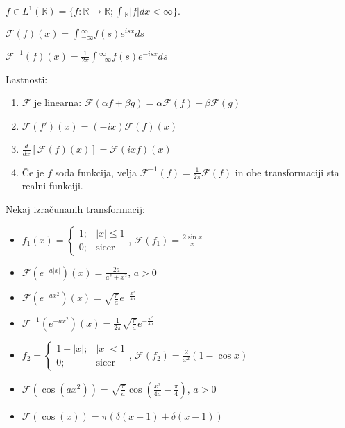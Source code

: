 \documentclass[11pt,a4paper]{amsart}
\theoremstyle{definition} %
\theoremstyle{plain} %
\let\oldint\int
\renewcommand{\int}{\oldint \!}
\newcommand{\R}{\mathbb R}
\newcommand{\F}{\mathcal{F}}
\begin{document}
$f \in L^1(\R ) = \{ f: \R \longrightarrow \R ; \int_\R |f| dx < \infty \}$.

$\F (f) (x) = \int_{-\infty}^\infty f(s) e^{isx} ds$

$\F^{-1} (f) (x) = \frac{1}{2\pi} \int_{-\infty}^\infty f(s) e^{-isx} ds$

Lastnosti:
\begin{enumerate}

\item $\F$ je linearna: $\F(\alpha f + \beta g) = \alpha \F(f) + \beta \F (g)$

\item $\F (f')(x) = (-ix) \F(f)(x)$

\item $\frac{d}{dx} \left[ \F (f)(x) \right] = \F(ixf) (x)$

\item Če je $f$ soda funkcija, velja $\F^{-1}(f) = \frac{1}{2\pi}\F(f)$ in obe transformaciji sta realni funkciji.

\end{enumerate}

Nekaj izračunanih transformacij:
\begin{itemize}

\item $f_1(x) = \begin{cases} 1;& |x| \leq 1 \\ 0; &\text{sicer} \end{cases}$, $\F(f_1) = \frac{2\sin x}{x}$

\item $\F (e^{-a|x|})(x) = \frac{2a}{a^2+x^2}$, $a>0$

\item $\F (e^{-ax^2})(x) = \sqrt{\frac{\pi}{a}}e^{-\frac{x^2}{4a}}$

\item $\F^{-1} (e^{-ax^2})(x) = \frac{1}{2\pi}\sqrt{\frac{\pi}{a}}e^{-\frac{x^2}{4a}}$

\item $f_2 = \begin{cases} 1-|x|;& |x|< 1 \\  0; & \text{sicer} \end{cases}$, $\F(f_2) = \frac{2}{x^2}(1-\cos x)$

\item $\F (\cos (ax^2) ) = \sqrt{\frac{\pi}{a}} \cos (\frac{x^2}{4a}-\frac{ \pi}{4} )$, $a > 0$

\item $\F (\cos (x) ) = \pi (\delta(x+1) + \delta(x-1))$

\end{itemize}
\end{document}
